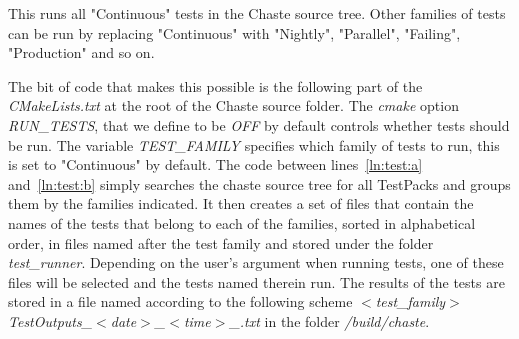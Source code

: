 \documentclass[10pt,a4paper]{article}
\begin{document}
\begin{center}
\end{center}

This runs all "Continuous" tests in the Chaste source tree. Other families of
tests can be run by replacing "Continuous" with "Nightly", "Parallel",
"Failing", "Production" and so on.

The bit of code that makes this possible is the following part of the
\textit{CMakeLists.txt} at the root of the Chaste source folder. The \textit{cmake} option \textit{RUN\_TESTS}, that we define to be \textit{OFF} by default controls whether tests should be run. The variable \textit{TEST\_FAMILY} specifies which family of tests to run, this is set to "Continuous" by default. The code between lines~\ref{ln:test:a} and~\ref{ln:test:b} simply searches the chaste source tree for all TestPacks and groups them by the families indicated. It then creates a set of files that contain the names of the tests that belong to each of the families, sorted in alphabetical order, in files named after the test family and stored under the folder \textit{test\_runner}. Depending on the user's argument when running tests, one of these files will be selected and the tests named therein run. The results of the tests are stored in a file named according to the following scheme \textit{$<$test\_family$>$TestOutputs\_$<$date$>$\_$<$time$>$\_.txt} in the folder \textit{\winbuild/build/chaste}.  
\end{document}
